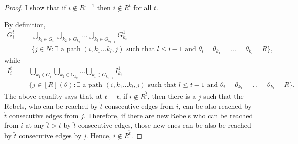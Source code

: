 \documentclass[12pt,letter]{article}
\theoremstyle{definition}
\theoremstyle{remark}
\theoremstyle{claim}
\begin{document}
\begin{proof}
I show that if $i\notin R^{t-1}$ then $i\notin R^t$ for all $t$. 

By definition, 
\begin{eqnarray*}
G^t_i & = & \bigcup_{k_1\in G_i}\bigcup_{k_2\in G_{k_0}}...\bigcup_{k_{t}\in G_{k_{t-1}}}G^{1}_{k_{t}}\\
&= & \{j\in N: \text{$\exists$ a path $(i,k_1...k_{l},j)$ such that $l\leq t-1$ and $\theta_i=\theta_{k_1}=...=\theta_{k_l}=R$}\},
\end{eqnarray*}
while
\begin{eqnarray*}
I^t_i & = & \bigcup_{k_1\in G_i}\bigcup_{k_2\in G_{k_0}}...\bigcup_{k_{t}\in G_{k_{t-1}}}I^{1}_{k_t}\\
&= & \{j\in [R](\theta): \text{$\exists$ a path $(i,k_1...k_{l},j)$ such that $l\leq t-1$ and $\theta_i=\theta_{k_1}=...=\theta_{k_l}=R$}\}.
\end{eqnarray*}
The above equality says that, at $t=\dot{t}$, if $i\notin R^{\dot{t}}$, then there is a $j$ such that the Rebels, who can be reached by $\dot{t}$ consecutive edges from $i$, can be also reached by $\dot{t}$ consecutive edges from $j$. Therefore, if there are new Rebels who can be reached from $i$ at any $\ddot{t}>\dot{t}$ by $\ddot{t}$ consecutive edges, those new ones can be also be reached by $\ddot{t}$ consecutive edges by $j$. Hence, $i\notin R^{\ddot{t}}$. 
\end{proof}
\end{document}
